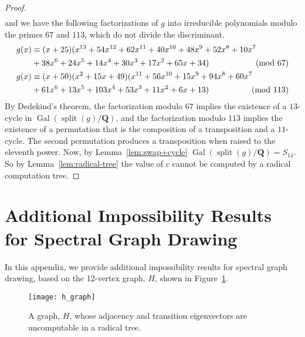 \documentclass[oribibl,10pt]{llncs}
\newcommand{\rationals}{\mathbf{Q}}
\DeclareMathOperator{\Gal}{Gal}
\DeclareMathOperator{\splitting}{split}
\begin{document}
\begin{appendix}
\begin{proof}
\begin{multline*}
\end{multline*}
and we have the following factorizations of $g$ into irreducible polynomials modulo the primes $67$ and $113$, which do not divide the discriminant.
\begin{align*}
g(x) &\equiv (x + 25)  (x^{13} + 54x^{12} + 62x^{11} + 40x^{10} + 48x^9 + 52x^8 + 10x^7\\
&+ 38x^6 + 24x^5 + 14x^4 + 30x^3 + 17x^2 + 65x + 34)
&\hspace{-2em}\pmod{67}\\
g(x) &\equiv (x + 50)  (x^2 + 15x + 49)  (x^{11} + 56x^{10} + 15x^9 + 94x^8 + 60x^7\\
&+ 61x^6 + 13x^5 + 103x^4 + 53x^3 + 11x^2 + 6x + 13)
&\hspace{-2em}\pmod{113}
\end{align*}
By Dedekind's theorem, the factorization modulo $67$ implies the existence of a $13$-cycle in $\Gal(\splitting(g)/\rationals)$, and the factorization modulo $113$ implies the existence of a permutation that is the composition of a transposition and a $11$-cycle. The second permutation produces a transposition when raised to the eleventh power. Now, by Lemma~\ref{lem:swap+cycle} $\Gal(\splitting(g)/\rationals) = S_{14}$. So by Lemma~\ref{lem:radical-tree} the value of $c$ cannot be computed by a radical computation tree.
\end{proof}

\clearpage
\section{Additional Impossibility Results for Spectral Graph Drawing}
\label{app:spectral}
In this appendix, we provide additional impossibility results for spectral
graph drawing, based on the 12-vertex graph, $H$, shown in
Figure~\ref{fig:h-graph}.

\begin{figure}[hbt]
\centering
\texttt{[image: h\_graph]}
\caption{A graph, $H$, whose adjacency and transition eigenvectors are uncomputable in a radical tree.}
\label{fig:h-graph}
\end{figure}


\end{appendix}
\end{document}
